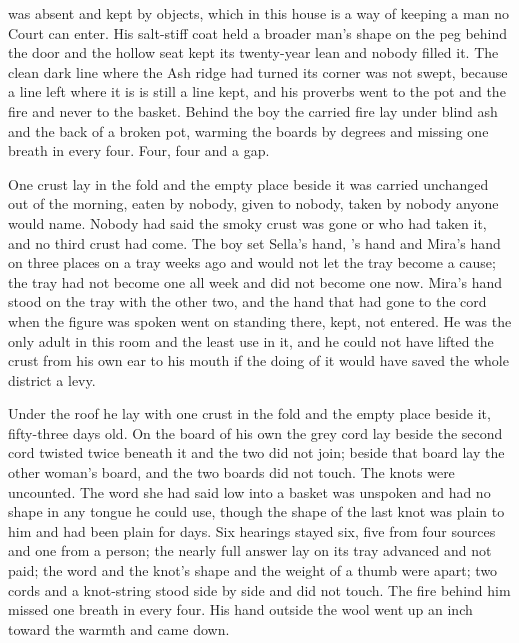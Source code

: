  was absent and kept by objects, which in this house is a way of keeping a man no Court can enter. His salt-stiff coat held a broader man's shape on the peg behind the door and the hollow seat kept its twenty-year lean and nobody filled it. The clean dark line where the Ash ridge had turned its corner was not swept, because a line left where it is is still a line kept, and his proverbs went to the pot and the fire and never to the basket. Behind the boy the carried fire lay under blind ash and the back of a broken pot, warming the boards by degrees and missing one breath in every four. Four, four and a gap.

One crust lay in the fold and the empty place beside it was carried unchanged out of the morning, eaten by nobody, given to nobody, taken by nobody anyone would name. Nobody had said the smoky crust was gone or who had taken it, and no third crust had come. The boy set Sella's hand, 's hand and Mira's hand on three places on a tray weeks ago and would not let the tray become a cause; the tray had not become one all week and did not become one now. Mira's hand stood on the tray with the other two, and the hand that had gone to the cord when the figure was spoken went on standing there, kept, not entered. He was the only adult in this room and the least use in it, and he could not have lifted the crust from his own ear to his mouth if the doing of it would have saved the whole district a levy.

\scenebreak

Under the roof he lay with one crust in the fold and the empty place beside it, fifty-three days old. On the board of his own the grey cord lay beside the second cord twisted twice beneath it and the two did not join; beside that board lay the other woman's board, and the two boards did not touch. The knots were uncounted. The word she had said low into a basket was unspoken and had no shape in any tongue he could use, though the shape of the last knot was plain to him and had been plain for days. Six hearings stayed six, five from four sources and one from a person; the nearly full answer lay on its tray advanced and not paid; the word and the knot's shape and the weight of a thumb were apart; two cords and a knot-string stood side by side and did not touch. The fire behind him missed one breath in every four. His hand outside the wool went up an inch toward the warmth and came down.
